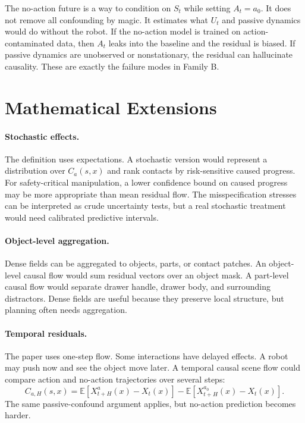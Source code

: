 \documentclass{article}
\newcommand{\noop}{a_0}
\begin{document}
The no-action future is a way to condition on $S_t$ while setting $A_t=\noop$.  It does
not remove all confounding by magic.  It estimates what $U_t$ and passive dynamics would
do without the robot.  If the no-action model is trained on action-contaminated data,
then $A_t$ leaks into the baseline and the residual is biased.  If passive dynamics are
unobserved or nonstationary, the residual can hallucinate causality.  These are exactly
the failure modes in Family B.

\section{Mathematical Extensions}

\paragraph{Stochastic effects.}
The definition uses expectations.  A stochastic version would represent a distribution
over $C_a(s,x)$ and rank contacts by risk-sensitive caused progress.  For safety-critical
manipulation, a lower confidence bound on caused progress may be more appropriate than
mean residual flow.  The misspecification stresses can be interpreted as crude uncertainty
tests, but a real stochastic treatment would need calibrated predictive intervals.

\paragraph{Object-level aggregation.}
Dense fields can be aggregated to objects, parts, or contact patches.  An object-level
causal flow would sum residual vectors over an object mask.  A part-level causal flow
would separate drawer handle, drawer body, and surrounding distractors.  Dense fields are
useful because they preserve local structure, but planning often needs aggregation.

\paragraph{Temporal residuals.}
The paper uses one-step flow.  Some interactions have delayed effects.  A robot may push
now and see the object move later.  A temporal causal scene flow could compare action and
no-action trajectories over several steps:
\[
  C_{a,H}(s,x)=\mathbb{E}[X^{a}_{t+H}(x)-X_t(x)]-
  \mathbb{E}[X^{\noop}_{t+H}(x)-X_t(x)].
\]
The same passive-confound argument applies, but no-action prediction becomes harder.
\end{document}
